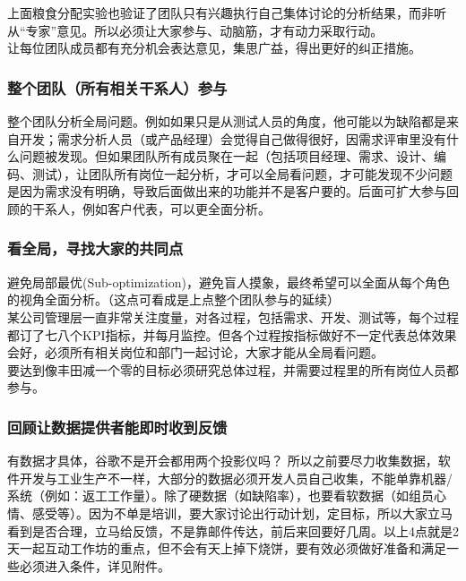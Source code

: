 上面粮食分配实验也验证了团队只有兴趣执行自己集体讨论的分析结果，而非听从``专家''意见。所以必须让大家参与、动脑筋，才有动力采取行动。\\
让每位团队成员都有充分机会表达意见，集思广益，得出更好的纠正措施。

\hypertarget{ux6574ux4e2aux56e2ux961fux6240ux6709ux76f8ux5173ux5e72ux7cfbux4ebaux53c2ux4e0e}{%
\subsubsection{整个团队（所有相关干系人）参与}\label{ux6574ux4e2aux56e2ux961fux6240ux6709ux76f8ux5173ux5e72ux7cfbux4ebaux53c2ux4e0e}}

整个团队分析全局问题。例如如果只是从测试人员的角度，他可能以为缺陷都是来自开发；需求分析人员（或产品经理）会觉得自己做得很好，因需求评审里没有什么问题被发现。但如果团队所有成员聚在一起（包括项目经理、需求、设计、编码、测试），让团队所有岗位一起分析，才可以全局看问题，才可能发现不少问题是因为需求没有明确，导致后面做出来的功能并不是客户要的。后面可扩大参与回顾的干系人，例如客户代表，可以更全面分析。\\

\hypertarget{ux770bux5168ux5c40ux5bfbux627eux5927ux5bb6ux7684ux5171ux540cux70b9}{%
\subsubsection{看全局，寻找大家的共同点}\label{ux770bux5168ux5c40ux5bfbux627eux5927ux5bb6ux7684ux5171ux540cux70b9}}

避免局部最优(Sub-optimization)，避免盲人摸象，最终希望可以全面从每个角色的视角全面分析。（这点可看成是上点整个团队参与的延续）\\
某公司管理层一直非常关注度量，对各过程，包括需求、开发、测试等，每个过程都订了七八个KPI指标，并每月监控。但各个过程按指标做好不一定代表总体效果会好，必须所有相关岗位和部门一起讨论，大家才能从全局看问题。\\
要达到像丰田减一个零的目标必须研究总体过程，并需要过程里的所有岗位人员都参与。

\hypertarget{ux56deux987eux8ba9ux6570ux636eux63d0ux4f9bux8005ux80fdux5373ux65f6ux6536ux5230ux53cdux9988}{%
\subsubsection{回顾让数据提供者能即时收到反馈}\label{ux56deux987eux8ba9ux6570ux636eux63d0ux4f9bux8005ux80fdux5373ux65f6ux6536ux5230ux53cdux9988}}

有数据才具体，谷歌不是开会都用两个投影仪吗？
所以之前要尽力收集数据，软件开发与工业生产不一样，大部分的数据必须开发人员自己收集，不能单靠机器/系统（例如：返工工作量）。除了硬数据（如缺陷率），也要看软数据（如组员心情、感受等）。因为不单是培训，要大家讨论出行动计划，定目标，所以大家立马看到是否合理，立马给反馈，不是靠邮件传达，前后来回要好几周。以上4点就是2天一起互动工作坊的重点，但不会有天上掉下烧饼，要有效必须做好准备和满足一些必须进入条件，详见附件。

